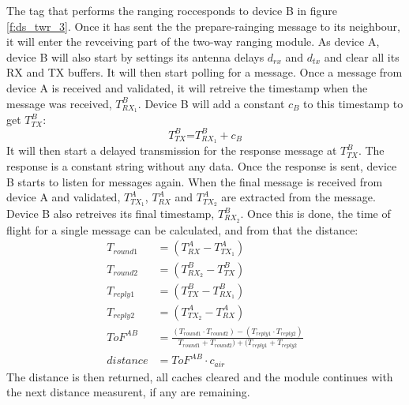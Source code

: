 The tag that performs the ranging roccesponds to device B in figure \ref{f:ds_twr_3}.
Once it has sent the the prepare-rainging message to its neighbour, it will enter the revceiving part of the two-way ranging module.
As device A, device B will also start by settings its antenna delays $d_{rx}$ and $d_{tx}$ and clear all its RX and TX buffers.
It will then start polling for a message.
Once a message from device A is received and validated, it will retreive the timestamp when the message was received, $T_{RX_1}^B$.
Device B will add a constant $c_B$ to this timestamp to get $T_{TX}^B$:
\begin{equation}
	\mbox{$T_{TX}^B$=}
	\mbox{$T_{RX_1}^B+c_B$}
\end{equation}
It will then start a delayed transmission for the response message at $T_{TX}^B$.
The response is a constant string without any data.
Once the response is sent, device B starts to listen for messages again.
When the final message is received from device A and validated, $T_{TX_1}^A$, $T_{RX}^A$ and $T_{TX_2}^A$ are extracted from the message.
Device B also retreives its final timestamp, $T_{RX_2}^B$.
Once this is done, the time of flight for a single message can be calculated, and from that the distance:
\begin{align}
    T_{round1} &= (T_{RX}^A - T_{TX_1}^A) \\
    T_{round2} &= (T_{RX_2}^B - T_{TX}^B) \\
    T_{reply1} &= (T_{TX}^B - T_{RX_1}^B) \\
    T_{reply2} &= (T_{TX_2}^A - T_{RX}^A) \\
    ToF^{AB} &= \frac{(T_{round1}\cdot T_{round2}) - (T_{reply1}\cdot T_{reply2})}{T_{round1} + T_{round2}) + (T_{reply1} + T_{reply2}} \\
    distance &= ToF^{AB} \cdot c_{air}
\end{align}
The distance is then returned, all caches cleared and the module continues with the next distance measurent, if any are remaining.


